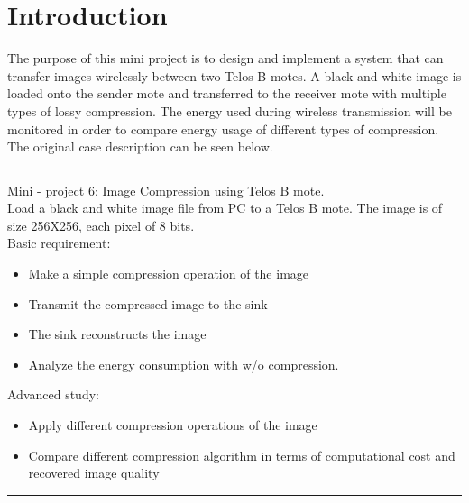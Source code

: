 \section{Introduction}
The purpose of this mini project is to design and implement a system that can transfer images wirelessly between two Telos B motes. A black and white image is loaded onto the sender mote and transferred to the receiver mote with multiple types of lossy compression. The energy used during wireless transmission will be monitored in order to compare energy usage of different types  of compression. The original case description can be seen below.

\begin{center}
\noindent\rule{4cm}{0.4pt}
\end{center}
Mini - project 6: Image Compression using Telos B mote.\\
Load a black and white image file from PC to a Telos B mote. The image is of size 256X256, each pixel of 8 bits.\\
Basic requirement:
\begin{itemize}
\item Make a simple compression operation of the image
\item Transmit the compressed image to the sink
\item The sink reconstructs the image
\item Analyze the energy consumption with w/o compression. 
\end{itemize}
Advanced study:
\begin{itemize}
\item Apply different compression operations of the image
\item Compare different compression algorithm in terms of computational cost and recovered image quality
\end{itemize}
\begin{center}
\noindent\rule{4cm}{0.4pt}
\end{center}

